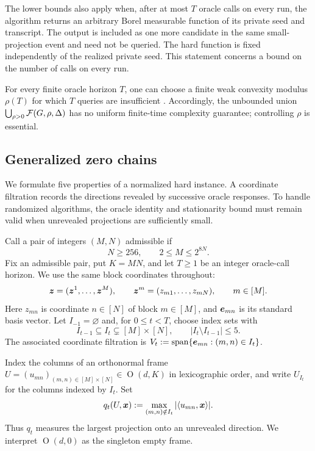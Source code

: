 \begin{remark}
The lower bounds also apply when, after at most $T$ oracle calls on
every run, the algorithm returns an arbitrary Borel measurable function
of its private seed and transcript. The output is included as one more
candidate in the same small-projection event and need not be queried.
The hard function is fixed independently of the realized private seed.
This statement concerns a bound on the number of calls on every run.
\end{remark}

\begin{remark}
For every finite oracle horizon $T$, one can choose a finite weak
convexity modulus $\rho(T)$ for which $T$ queries are insufficient
\citep{tian2021hardness}. Accordingly, the unbounded union
$\bigcup_{\rho>0}{\cal F}(G,\rho,\Delta)$ has no uniform finite-time
complexity guarantee; controlling $\rho$ is essential.
\end{remark}

\subsection{Generalized zero chains}
\label{subsec:abstract-framework}

We formulate five properties of a normalized hard instance.
A coordinate filtration records the directions revealed by successive
oracle responses. To handle randomized algorithms, the oracle identity
and stationarity bound must remain valid when unrevealed projections
are sufficiently small.

Call a pair of integers $(M,N)$ admissible if
\begin{equation}
 N\ge256,\qquad 2\le M\le2^{8N}.
 \label{eq:normalized-admissible}
\end{equation}
Fix an admissible pair, put $K=MN$, and let $T\ge1$ be an integer
oracle-call horizon. We use the same block coordinates throughout:
\[
 \bm{z}=(\bm{z}^1,\ldots,\bm{z}^M),\qquad
 \bm{z}^m=(z_{m1},\ldots,z_{mN}),\qquad m\in[M].
\]
Here $z_{mn}$ is coordinate $n\in[N]$ of block $m\in[M]$,
and $\bm{e}_{mn}$ is its standard basis vector.
Let $I_{-1}=\varnothing$ and, for $0\le t<T$, choose index sets with
\[
 I_{t-1}\subseteq I_t\subsetneq[M]\times[N],
 \qquad |I_t\setminus I_{t-1}|\le5.
\]
The associated coordinate filtration is
$V_t:=\operatorname{span}\{\bm{e}_{mn}:(m,n)\in I_t\}$.

Index the columns of an orthonormal frame
$U=(u_{mn})_{(m,n)\in[M]\times[N]}\in\operatorname O(d,K)$
in lexicographic order, and write $U_{I_t}$ for the columns
indexed by $I_t$. Set
\[
 q_t(U,\bm{x}):=\max_{(m,n)\notin I_t}|\langle u_{mn},\bm{x}\rangle|.
\]
Thus $q_t$ measures the largest projection onto an unrevealed
direction. We interpret $\operatorname O(d,0)$ as the singleton
empty frame.

